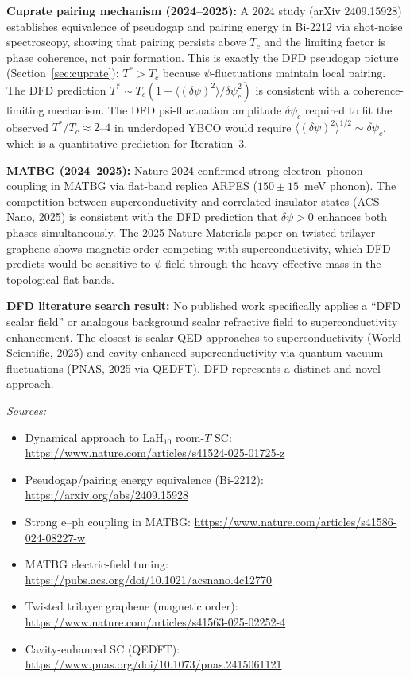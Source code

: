 \documentclass[11pt]{article}
\begin{document}
\textbf{Cuprate pairing mechanism (2024--2025):}
A 2024 study (arXiv 2409.15928) establishes equivalence of pseudogap and
pairing energy in Bi-2212 via shot-noise spectroscopy, showing that pairing
persists above $T_c$ and the limiting factor is phase coherence, not
pair formation. This is exactly the DFD pseudogap picture (Section~\ref{sec:cuprate}):
$T^* > T_c$ because $\psi$-fluctuations maintain local pairing. The DFD
prediction $T^* \sim T_c(1 + \langle(\delta\psi)^2\rangle/\delta\psi_c^2)$
is consistent with a coherence-limiting mechanism. The DFD psi-fluctuation
amplitude $\delta\psi_c$ required to fit the observed $T^*/T_c \approx 2$--$4$
in underdoped YBCO would require $\langle(\delta\psi)^2\rangle^{1/2} \sim \delta\psi_c$,
which is a quantitative prediction for Iteration~3.

\textbf{MATBG (2024--2025):}
Nature 2024 confirmed strong electron--phonon coupling in MATBG via flat-band
replica ARPES ($150 \pm 15$~meV phonon). The competition between
superconductivity and correlated insulator states (ACS Nano, 2025) is
consistent with the DFD prediction that $\delta\psi > 0$ enhances both phases
simultaneously. The 2025 Nature Materials paper on twisted trilayer graphene
shows magnetic order competing with superconductivity, which DFD predicts
would be sensitive to $\psi$-field through the heavy effective mass
in the topological flat bands.

\textbf{DFD literature search result:}
No published work specifically applies a ``DFD scalar field'' or analogous
background scalar refractive field to superconductivity enhancement. The
closest is scalar QED approaches to superconductivity (World Scientific, 2025)
and cavity-enhanced superconductivity via quantum vacuum fluctuations (PNAS, 2025
via QEDFT). DFD represents a distinct and novel approach.

\bigskip
\noindent\textit{Sources:}
\begin{itemize}[nosep]
\item Dynamical approach to LaH$_{10}$ room-$T$ SC: \url{https://www.nature.com/articles/s41524-025-01725-z}
\item Pseudogap/pairing energy equivalence (Bi-2212): \url{https://arxiv.org/abs/2409.15928}
\item Strong e--ph coupling in MATBG: \url{https://www.nature.com/articles/s41586-024-08227-w}
\item MATBG electric-field tuning: \url{https://pubs.acs.org/doi/10.1021/acsnano.4c12770}
\item Twisted trilayer graphene (magnetic order): \url{https://www.nature.com/articles/s41563-025-02252-4}
\item Cavity-enhanced SC (QEDFT): \url{https://www.pnas.org/doi/10.1073/pnas.2415061121}
\end{itemize}
\end{document}

